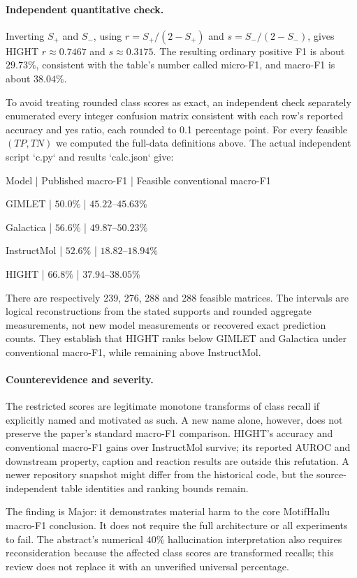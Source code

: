 \documentclass[10pt]{article}
\begin{document}
\paragraph*{Independent quantitative check.}\mbox{}\par
Inverting \(S_+\) and \(S_-\), using \(r=S_+/(2-S_+)\) and \(s=S_-/(2-S_-)\), gives HIGHT \(r\approx0.7467\) and \(s\approx0.3175\). The resulting ordinary positive F1 is about \(29.73\%\), consistent with the table’s number called micro-F1, and macro-F1 is about \(38.04\%\).\par
To avoid treating rounded class scores as exact, an independent check separately enumerated every integer confusion matrix consistent with each row’s reported accuracy and yes ratio, each rounded to 0.1 percentage point. For every feasible \((TP,TN)\) we computed the full-data definitions above. The actual independent script `c.py` and results `calc.json` give:\par
Model | Published macro-F1 | Feasible conventional macro-F1\par
GIMLET | \(50.0\%\) | \(45.22\)–\(45.63\%\)\par
Galactica | \(56.6\%\) | \(49.87\)–\(50.23\%\)\par
InstructMol | \(52.6\%\) | \(18.82\)–\(18.94\%\)\par
HIGHT | \(66.8\%\) | \(37.94\)–\(38.05\%\)\par
There are respectively 239, 276, 288 and 288 feasible matrices. The intervals are logical reconstructions from the stated supports and rounded aggregate measurements, not new model measurements or recovered exact prediction counts. They establish that HIGHT ranks below GIMLET and Galactica under conventional macro-F1, while remaining above InstructMol.\par
\paragraph*{Counterevidence and severity.}\mbox{}\par
The restricted scores are legitimate monotone transforms of class recall if explicitly named and motivated as such. A new name alone, however, does not preserve the paper’s standard macro-F1 comparison. HIGHT’s accuracy and conventional macro-F1 gains over InstructMol survive; its reported AUROC and downstream property, caption and reaction results are outside this refutation. A newer repository snapshot might differ from the historical code, but the source-independent table identities and ranking bounds remain.\par
The finding is Major: it demonstrates material harm to the core MotifHallu macro-F1 conclusion. It does not require the full architecture or all experiments to fail. The abstract’s numerical \(40\%\) hallucination interpretation also requires reconsideration because the affected class scores are transformed recalls; this review does not replace it with an unverified universal percentage.\par
\end{document}
